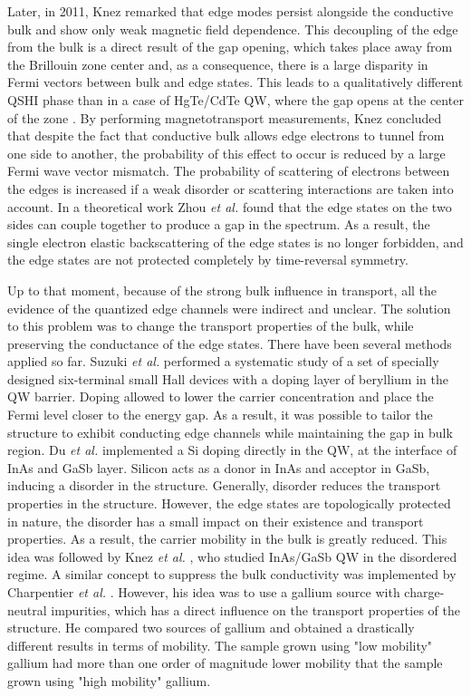 \documentclass[titlepage,a4paper]{book}
\begin{document}
Later, in 2011, Knez remarked that edge modes persist alongside the conductive bulk and show only weak magnetic field dependence. This decoupling of the edge from the bulk is a direct result of the gap opening, which takes place away from the Brillouin zone center and, as a consequence, there is a large disparity in Fermi vectors between bulk and edge states. This leads to a qualitatively different QSHI phase than in a case of HgTe/CdTe QW, where the gap opens at the center of the zone \cite{Knez2_State}. By performing magnetotransport measurements, Knez concluded that despite the fact that conductive bulk allows edge electrons to tunnel from one side to another, the probability of this effect to occur is reduced by a large Fermi wave vector mismatch. The probability of scattering of electrons between the edges is increased if a weak disorder or scattering interactions are taken into account. In a theoretical work Zhou \textit{et al.} \cite{Zhou_State} found that the edge states on the two sides can couple together to produce a gap in the spectrum. As a result, the single electron elastic backscattering of the edge states is no longer forbidden, and the edge states are not protected completely by time-reversal symmetry. 

Up to that moment, because of the strong bulk influence in transport, all the evidence of the quantized edge channels were indirect and unclear. The solution to this problem was to change the transport properties of the bulk, while preserving the conductance of the edge states. There have been several methods applied so far. Suzuki  \textit{et al.}\cite{Suzuki_State} performed a systematic study of a set of specially designed six-terminal small Hall devices with a doping layer of beryllium in the QW barrier. Doping allowed to lower the carrier concentration and place the Fermi level closer to the energy gap. As a result, it was possible to tailor the structure to exhibit conducting edge channels while maintaining the gap in bulk region. Du \textit{et al.} \cite{Du_State} implemented a Si doping directly in the QW, at the interface of InAs and GaSb layer. Silicon acts as a donor in InAs and acceptor in GaSb, inducing a disorder in the structure. Generally, disorder reduces the transport properties in the structure. However, the edge states are topologically protected in nature, the disorder has a small impact on their existence and transport properties. As a result, the carrier mobility in the bulk is greatly reduced. This idea was followed by Knez \textit{et al.} \cite{Knez3_State}, who studied InAs/GaSb QW in the disordered regime. A similar concept to suppress the bulk conductivity was implemented by Charpentier \textit{et al.} \cite{Charpentier_State}. However, his idea was to use a gallium source with charge-neutral impurities, which has a direct influence on the transport properties of the structure. He compared two sources of gallium and obtained a drastically different results in terms of mobility. The sample grown using "low mobility" gallium had more than one order of magnitude lower mobility that the sample grown using "high mobility" gallium. 
\end{document}
